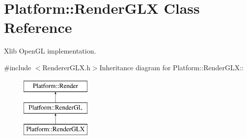 \hypertarget{classPlatform_1_1RenderGLX}{
\section{Platform::RenderGLX Class Reference}
\label{classPlatform_1_1RenderGLX}
}


Xlib OpenGL implementation.  


{\ttfamily \#include $<$RendererGLX.h$>$}Inheritance diagram for Platform::RenderGLX::\begin{figure}[H]
\begin{center}
\leavevmode
\includegraphics[height=3cm]{classPlatform_1_1RenderGLX}
\end{center}
\end{figure}
